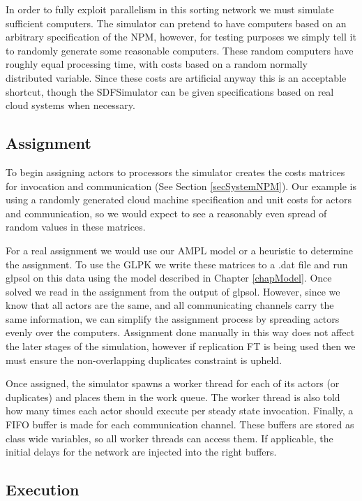 In order to fully exploit parallelism in this sorting network we must simulate sufficient computers.
The simulator can pretend to have computers based on an arbitrary specification of the NPM, however, for testing purposes we simply tell it to randomly generate some reasonable computers.
These random computers have roughly equal processing time, with costs based on a random normally distributed variable.
Since these costs are artificial anyway this is an acceptable shortcut, though the SDFSimulator can be given specifications based on real cloud systems when necessary.

\subsection{Assignment}

To begin assigning actors to processors the simulator creates the costs matrices for invocation and communication (See Section \ref{secSystemNPM}).
Our example is using a randomly generated cloud machine specification and unit costs for actors and communication, so we would expect to see a reasonably even spread of random values in these matrices.

For a real assignment we would use our AMPL model or a heuristic to determine the assignment.
To use the GLPK we write these matrices to a .dat file and run glpsol on this data using the model described in Chapter \ref{chapModel}.
Once solved we read in the assignment from the output of glpsol.
However, since we know that all actors are the same, and all communicating channels carry the same information, we can simplify the assignment process by spreading actors evenly over the computers.
Assignment done manually in this way does not affect the later stages of the simulation, however if replication FT is being used then we must ensure the non-overlapping duplicates constraint is upheld.

Once assigned, the simulator spawns a worker thread for each of its actors (or duplicates) and places them in the work queue.
The worker thread is also told how many times each actor should execute per steady state invocation.
Finally, a FIFO buffer is made for each communication channel.
These buffers are stored as class wide variables, so all worker threads can access them.
If applicable, the initial delays for the network are injected into the right buffers.

\subsection{Execution}

